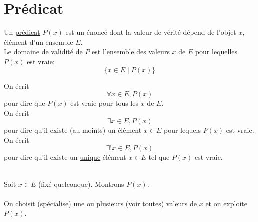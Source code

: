 \part{Prédicat}

\begin{defn}
	Un \underline{prédicat} $P(x)$ est un énoncé dont la valeur de vérité dépend de l'objet $x$, élément d'un ensemble $E$.\\
	Le \underline{domaine de validité} de $P$ est l'ensemble des valeurs $x$ de $E$ pour lequelles $P(x)$ est vraie: \[
		\{x \in E  \mid P(x)\} 
	\]
\end{defn}

\begin{rmk}
	[Notation]
	On écrit \[
		\forall x \in E, P(x)
	\] pour dire que $P(x)$ est vraie pour tous les $x$ de $E$.\\

	On écrit \[
		\exists x \in E, P(x)
	\] pour dire qu'il existe (au moints) un élément $x \in E$ pour lequels $P(x)$ est vraie.\\

	On écrit \[
		\exists! x \in E, P(x)
	\] pour dire qu'il existe un \underline{unique} élément $x \in E$ tel que $P(x)$ est vraie.
\end{rmk}

\vspace{5mm}
~~
\\
Soit $x \in E$ (fixé quelconque). Montrons $P(x)$.\\

\vspace{2mm}
\\
On choisit (spécialise) une ou plusieurs (voir toutes) valeurs de $x$ et on exploite $P(x)$.\\

\vspace{8mm}

